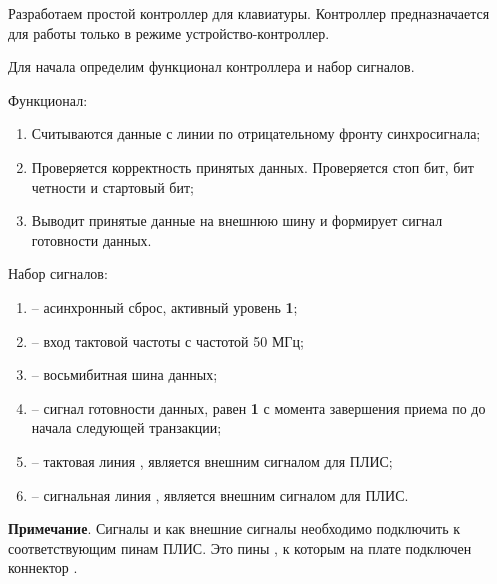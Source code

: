 \vspace{4mm}

\par{Разработаем простой контроллер для клавиатуры. Контроллер предназначается для работы только в режиме устройство-контроллер.}

\par{Для начала определим функционал контроллера и набор сигналов.}

\par{Функционал:}
  \begin{enumerate}[noitemsep,topsep=0pt, after=\vspace{2pt}]
    \item Считываются данные с линии  по отрицательному фронту синхросигнала;
    \item Проверяется корректность принятых данных. Проверяется стоп бит, бит четности и стартовый бит;
    \item Выводит принятые данные на внешнюю шину и формирует сигнал готовности данных.
  \end{enumerate}

\par{Набор сигналов:}
  \begin{enumerate}[noitemsep,topsep=0pt, after=\vspace{2pt}]
    \item {} – асинхронный сброс, активный уровень \textbf{1};
    \item {} – вход тактовой частоты с частотой 50 МГц;
    \item {} – восьмибитная шина данных;
    \item {} – сигнал готовности данных, равен \textbf{1} с момента завершения приема по  до начала следующей транзакции;
    \item {} – тактовая линия , является внешним сигналом для ПЛИС;
    \item {} – сигнальная линия , является внешним сигналом для ПЛИС.
  \end{enumerate}

\par{\textbf{Примечание}. Сигналы  и  как внешние сигналы необходимо подключить к соответствующим пинам ПЛИС. Это пины , к которым на плате  подключен коннектор .}




